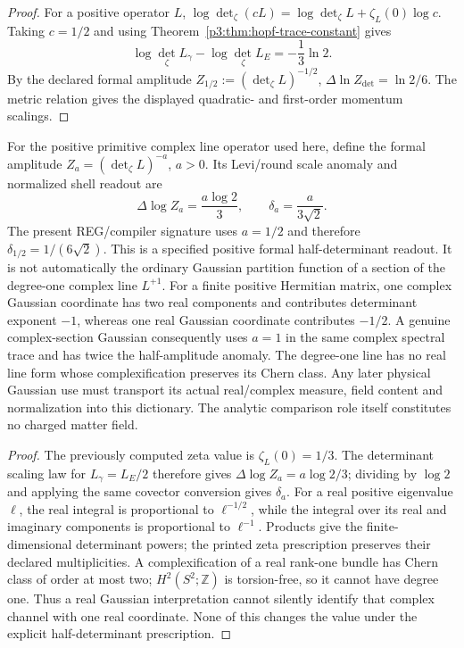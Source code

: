 \documentclass[12pt,a4paper]{article}
\begin{document}
\begin{proof}
For a positive operator \(L\),
\(\log\det_\zeta(cL)=\log\det_\zeta L+\zeta_L(0)\log c\).
Taking \(c=1/2\) and using
Theorem~\ref{p3:thm:hopf-trace-constant} gives
\[
 \log\det_\zeta L_\gamma-\log\det_\zeta L_E
 =-\frac13\ln2.
\]
By the declared formal amplitude \(Z_{1/2}:=(\det_\zeta L)^{-1/2}\),
\(\Delta\ln Z_{\det}=\ln2/6\).  The metric relation gives the displayed
quadratic- and first-order momentum scalings.
\end{proof}

\begin{proposition}
\label{p3c:prop:v2211-determinant-amplitude-measure}
For the positive primitive complex line operator used here, define the formal
amplitude $Z_a=(\det_\zeta L)^{-a}$, $a>0$. Its Levi/round scale anomaly
and normalized shell readout are
\[
 \boxed{\Delta\log Z_a=\frac{a\log2}{3},\qquad
 \delta_a=\frac{a}{3\sqrt2}.}
\]
The present REG/compiler signature uses $a=1/2$ and therefore
$\delta_{1/2}=1/(6\sqrt2)$. This is a specified positive formal
half-determinant readout. It is not automatically the ordinary Gaussian
partition function of a section of the degree-one complex line $L^{+1}$.
For a finite positive Hermitian matrix, one complex Gaussian coordinate has
two real components and contributes determinant exponent $-1$, whereas one
real Gaussian coordinate contributes $-1/2$. A genuine complex-section
Gaussian consequently uses $a=1$ in the same complex spectral trace and has
twice the half-amplitude anomaly. The degree-one line has no real line form
whose complexification preserves its Chern class. Any later physical Gaussian
use must transport its actual real/complex measure, field content and
normalization into this dictionary. The analytic comparison role itself
constitutes no charged matter field.
\end{proposition}
\begin{proof}
The previously computed zeta value is $\zeta_L(0)=1/3$. The determinant
scaling law for $L_\gamma=L_E/2$ therefore gives
$\Delta\log Z_a=a\log2/3$; dividing by $\log2$ and applying the same
covector conversion gives $\delta_a$. For a real positive eigenvalue
$\ell$, the real integral is proportional to $\ell^{-1/2}$, while the
integral over its real and imaginary components is proportional to
$\ell^{-1}$. Products give the finite-dimensional determinant powers;
the printed zeta prescription preserves their declared multiplicities.
A complexification of a real rank-one bundle has Chern class of order at
most two; $H^2(S^2;\mathbb Z)$ is torsion-free, so it cannot have degree
one. Thus a real Gaussian interpretation cannot silently identify that
complex channel with one real coordinate. None of this changes the value
under the explicit half-determinant prescription.
\end{proof}
\end{document}
